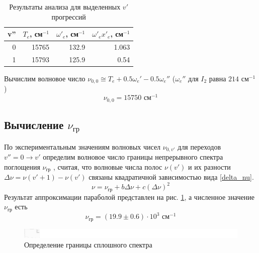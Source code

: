 \begin{table}[htbp]
	\centering
	\caption{Результаты анализа для выделенных $v'$ прогрессий}
	\begin{tabular}{|r|r|r|r|}
		\hline
		\multicolumn{1}{|l|}{v''} & \multicolumn{1}{l|}{$T_e$, см$^{-1}$} & \multicolumn{1}{l|}{$\omega'_e$, см$^{-1}$} & \multicolumn{1}{l|}{$\omega'_e x'_e$, см$^{-1}$} \bigstrut\\
		\hline
		0 & 15765 & 132.9 & 1.063 \bigstrut\\
		\hline
		1 & 15793 & 125.9 & 0.54 \bigstrut\\
		\hline
	\end{tabular}%
	\label{tab:parabola}%
\end{table}%

Вычислим волновое число $\nu_{0,0} \cong T_e + 0.5\omega_e' - 0.5\omega_e''$ ($\omega_e''$ для $I_2$ равна $214$ см$^{-1}$)
\begin{equation}
\nu_{0,0} = 15750 \text{ см$^{-1}$}
\end{equation}


\subsection{Вычисление $\nu_{\text{гр}}$}
По экспериментальным значениям волновых чисел $\nu_{0,v'}$ для переходов $v''= 0 \to v'$ определим волновое число границы непрерывного спектра поглощения $\nu_{\text{гр}}$ , считая, что волновые числа полос $\nu(v')$ и их разности $\Delta \nu =\nu(v'+1)-\nu(v')$ связаны квадратичной зависимостью
вида \eqref{delta_nu}.
\begin{equation}
\nu = \nu_{\text{гр}} +b\Delta\nu+c\left(\Delta \nu\right)^2
\label{delta_nu}
\end{equation}
Результат аппроксимации параболой представлен на рис. \ref{fig:delta_nu}, а численное значение $\nu_{\text{гр}}$ есть
\begin{equation}
\nu_{\text{гр}} = (19.9 \pm 0.6) \cdot 10^3 \text{ см$^{-1}$}
\end{equation}
\begin{figure}[h!]
	\centering
	\includegraphics[height=0.45\textheight]{data/delta_nu}
	\caption{Определение границы сплошного спектра}
	\label{fig:delta_nu}
\end{figure}

